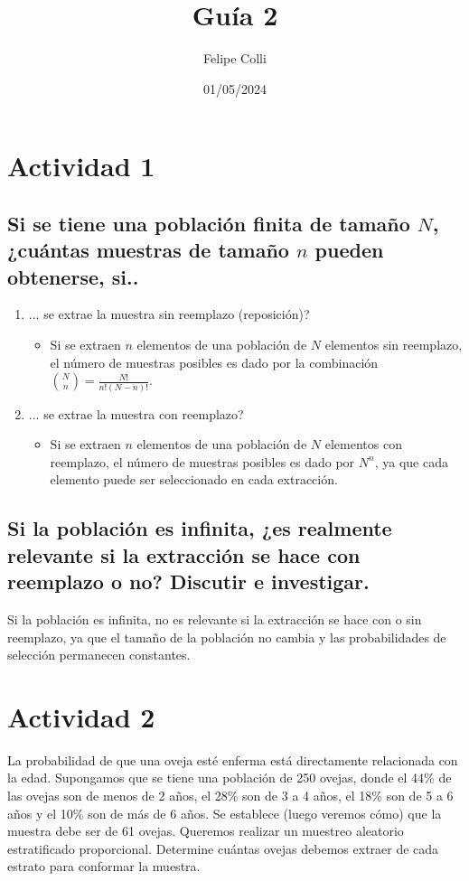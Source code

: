 \documentclass[12pt, letterpaper]{article}
\title{Guía 2}
\author{Felipe Colli}
\date{01/05/2024}
\begin{document}
\maketitle
\tableofcontents
\newpage

    \section{Actividad 1}
        \subsection{Si se tiene una población finita de tamaño $N$, ¿cuántas muestras de tamaño $n$ pueden obtenerse, si..}
            \begin{enumerate}
                \item ... se extrae la muestra sin reemplazo (reposición)? \\
                    \begin{itemize}
                        \item Si se extraen $n$ elementos de una población de $N$ elementos sin reemplazo, el número de muestras posibles es dado por la combinación $\binom{N}{n} = \frac{N!}{n!(N-n)!}$.
                    \end{itemize}
                \item ... se extrae la muestra con reemplazo? \\
                    \begin{itemize}
                        \item Si se extraen $n$ elementos de una población de $N$ elementos con reemplazo, el número de muestras posibles es dado por $N^n$, ya que cada elemento puede ser seleccionado en cada extracción.
                    \end{itemize}
            \end{enumerate}

        \subsection{Si la población es infinita, ¿es realmente relevante si la extracción se hace con reemplazo o no? Discutir e investigar.}
            Si la población es infinita, no es relevante si la extracción se hace con o sin reemplazo, ya que el tamaño de la población no cambia y las probabilidades de selección permanecen constantes.

    \section{Actividad 2} La probabilidad de que una oveja esté enferma está directamente relacionada con la edad. Supongamos que se tiene una población de 250 ovejas, donde el 44\% de las ovejas son de menos de 2 años, el 28\% son de 3 a 4 años, el 18\% son de 5 a 6 años y el 10\% son de más de 6 años. Se establece (luego veremos cómo) que la muestra debe ser de 61 ovejas. Queremos realizar un muestreo aleatorio estratificado proporcional. Determine cuántas ovejas debemos extraer de cada estrato para conformar la muestra.
\end{document}
